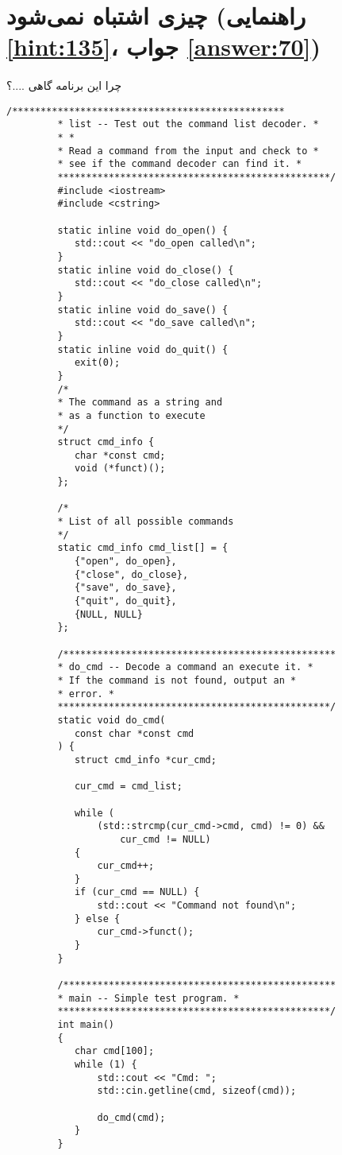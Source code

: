 \section[چیزی اشتباه نمی‌شود]{چیزی اشتباه نمی‌شود \protect{} (راهنمایی \ref{hint:135}، جواب \ref{answer:70})}
\paragraph{}\label{prog:46}
چرا این برنامه گاهی ....؟

\begin{LTR}
    \begin{lstlisting}[style=C++Style]
         /************************************************
         * list -- Test out the command list decoder. *
         * *
         * Read a command from the input and check to *
         * see if the command decoder can find it. *
         ************************************************/
         #include <iostream>
         #include <cstring>

         static inline void do_open() {
         	std::cout << "do_open called\n";
         }
         static inline void do_close() {
         	std::cout << "do_close called\n";
         }
         static inline void do_save() {
         	std::cout << "do_save called\n";
         }
         static inline void do_quit() {
         	exit(0);
         }
         /*
         * The command as a string and
         * as a function to execute
         */
         struct cmd_info {
         	char *const cmd;
         	void (*funct)();
         };

         /*
         * List of all possible commands
         */
         static cmd_info cmd_list[] = {
         	{"open", do_open},
         	{"close", do_close},
         	{"save", do_save},
         	{"quit", do_quit},
         	{NULL, NULL}
         };

         /************************************************
         * do_cmd -- Decode a command an execute it. *
         * If the command is not found, output an *
         * error. *
         ************************************************/
         static void do_cmd(
         	const char *const cmd
         ) {
         	struct cmd_info *cur_cmd;

         	cur_cmd = cmd_list;

         	while (
         		(std::strcmp(cur_cmd->cmd, cmd) != 0) &&
         			cur_cmd != NULL)
         	{
         		cur_cmd++;
         	}
         	if (cur_cmd == NULL) {
         		std::cout << "Command not found\n";
         	} else {
         		cur_cmd->funct();
         	}
         }

         /************************************************
         * main -- Simple test program. *
         ************************************************/
         int main()
         {
         	char cmd[100];
         	while (1) {
         		std::cout << "Cmd: ";
         		std::cin.getline(cmd, sizeof(cmd));

         		do_cmd(cmd);
         	}
         }
    \end{lstlisting}
\end{LTR}